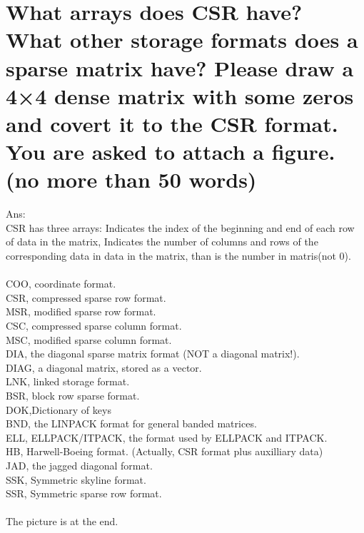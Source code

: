 \documentclass{article}
\begin{document}
\section{What arrays does CSR have? What other storage formats does a sparse matrix have? Please draw a 4×4 dense matrix with some zeros and covert it to the CSR format. You are asked to attach a figure. (no more than 50 words)}

Ans:%
\\CSR has three arrays: Indicates the index of the beginning and end of each row of data in the matrix, Indicates the number of columns and rows of the corresponding data in data in the matrix, than is the number in matris(not 0).\\
\\COO, coordinate format.\\
CSR, compressed sparse row format.\\
MSR, modified sparse row format.\\
CSC, compressed sparse column format.\\
MSC, modified sparse column format.\\
DIA, the diagonal sparse matrix format (NOT a diagonal matrix!).\\
DIAG, a diagonal matrix, stored as a vector.\\
LNK, linked storage format.\\
BSR, block row sparse format.\\
DOK,Dictionary of keys\\
BND, the LINPACK format for general banded matrices.\\
ELL, ELLPACK/ITPACK, the format used by ELLPACK and ITPACK.\\
HB, Harwell-Boeing format. (Actually, CSR format plus auxilliary data)\\
JAD, the jagged diagonal format.\\
SSK, Symmetric skyline format.\\
SSR, Symmetric sparse row format.\\
\\The picture is at the end.

\end{document}
